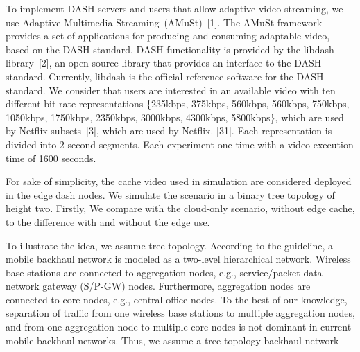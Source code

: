 
To implement DASH servers and users that allow adaptive video streaming, we use Adaptive Multimedia Streaming~(AMuSt)~[1]. The AMuSt framework provides a set of applications for producing and consuming adaptable video, based on the DASH standard. DASH functionality is provided by the libdash library~[2], an open source library that provides an interface to the DASH standard. Currently, libdash is the official reference software for the DASH standard. We consider that users are interested in an available video with ten different bit rate representations \{235kbps, 375kbps, 560kbps, 560kbps, 750kbps, 1050kbps, 1750kbps, 2350kbps, 3000kbps, 4300kbps, 5800kbps\}, which are used by Netflix subsets~[3], which are used by Netflix. [31]. Each representation is divided into 2-second segments. Each experiment one time with a video execution time of 1600 seconds. %


For sake of simplicity, the cache video used in simulation are considered deployed in the edge dash nodes.
We simulate the scenario in a binary tree topology of height two. Firstly, We compare with the cloud-only scenario, without edge cache, to the difference with and without the edge use.

To illustrate the idea, we assume tree topology. According to the guideline, a mobile backhaul network is modeled as a two-level hierarchical network. Wireless base stations are connected to aggregation nodes, e.g., service/packet data network gateway (S/P-GW) nodes. Furthermore, aggregation nodes are connected to core nodes, e.g., central office nodes. To the best of our knowledge, separation of traffic from one wireless base stations to multiple aggregation nodes, and from one aggregation node to multiple core nodes is not dominant in current mobile backhaul networks. Thus, we assume a tree-topology backhaul network


